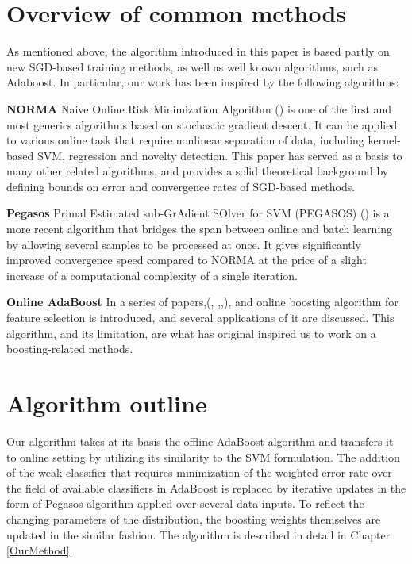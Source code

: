 \section{Overview of common methods} %
As mentioned above, the algorithm introduced in this paper is based partly on new SGD-based training methods, as well as well known algorithms, such as Adaboost. In particular, our work has been inspired by the following algorithms:

{\bf NORMA} Naive Online Risk Minimization Algorithm (\cite{Norma}) is one of the first and most generics algorithms based on stochastic gradient descent. It can be applied to various online task that require nonlinear separation of data, including kernel-based SVM, regression and novelty detection. This paper has served as a basis to many other related algorithms, and provides a solid theoretical background by defining bounds on error and convergence rates of SGD-based methods.

{\bf Pegasos} Primal Estimated sub-GrAdient SOlver for SVM (PEGASOS) (\cite{Pegasos}) is a more recent algorithm that bridges the span between online and batch learning by allowing several samples to be processed at once. It gives significantly improved convergence speed compared to NORMA at the price of a slight increase of a computational complexity of a single iteration. 

{\bf Online AdaBoost} In a series of papers,(\cite{grabner2006}, \cite{OnlineBoost},\cite{grabner2008},\cite{grabner2009}), and online boosting algorithm for feature selection is introduced, and several applications of it are discussed. This algorithm, and its limitation, are what has original inspired us to work on a boosting-related methods.


\section{Algorithm outline}

Our algorithm takes at its basis the offline AdaBoost algorithm and transfers it to online setting by utilizing its similarity to the SVM formulation. The addition of the weak classifier that requires minimization of the weighted error rate over the field of available classifiers in AdaBoost is replaced by iterative updates in the form of Pegasos algorithm applied over several data inputs. To reflect the changing parameters of the distribution, the boosting weights themselves are updated in the similar fashion.  The algorithm is described in detail in Chapter \ref{OurMethod}. 

